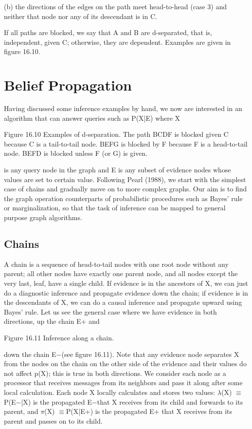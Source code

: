 (b) the directions of the edges on the path meet head-to-head (case 3) and neither that node nor any of its descendant is in C.

If all paths are blocked, we say that A and B are d-separated, that is, independent, given C; otherwise, they are dependent. Examples are given in figure 16.10.

\section{Belief Propagation}

Having discussed some inference examples by hand, we now are interested in an algorithm that can answer queries such as P(X|E) where X

Figure 16.10 Examples of d-separation. The path BCDF is blocked given C because C is a tail-to-tail node. BEFG is blocked by F because F is a head-to-tail node. BEFD is blocked unless F (or G) is given.

is any query node in the graph and E is any subset of evidence nodes whose values are set to certain value. Following Pearl (1988), we start with the simplest case of chains and gradually move on to more complex graphs. Our aim is to find the graph operation counterparts of probabilistic procedures such as Bayes’ rule or marginalization, so that the task of inference can be mapped to general purpose graph algorithms.

\subsection{Chains}

A chain is a sequence of head-to-tail nodes with one root node without any parent; all other nodes have exactly one parent node, and all nodes except the very last, leaf, have a single child. If evidence is in the ancestors of X, we can just do a diagnostic inference and propagate evidence down the chain; if evidence is in the descendants of X, we can do a causal inference and propagate upward using Bayes’ rule. Let us see the general case where we have evidence in both directions, up the chain E+ and

Figure 16.11 Inference along a chain.

down the chain E$-$(see figure 16.11). Note that any evidence node separates X from the nodes on the chain on the other side of the evidence and their values do not affect p(X); this is true in both directions. We consider each node as a processor that receives messages from its neighbors and pass it along after some local calculation. Each node X locally calculates and stores two values: $\lambda$(X) $\equiv$P(E$-$|X) is the propagated E$-$that X receives from its child and forwards to its parent, and $\pi$(X) $\equiv$P(X|E+) is the propagated E+ that X receives from its parent and passes on to its child.


